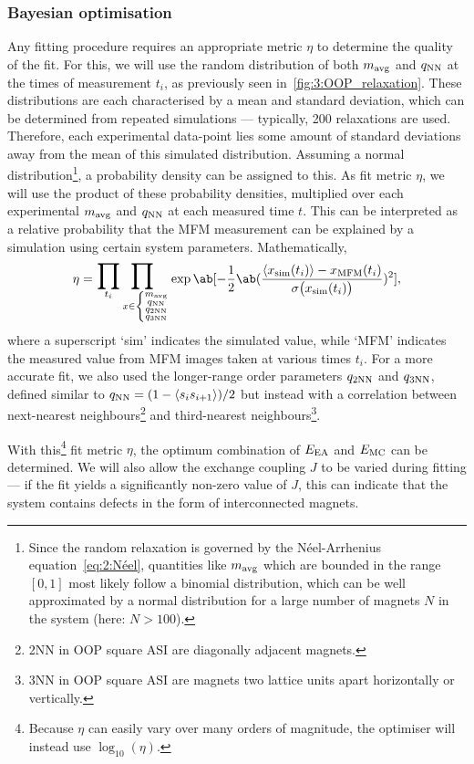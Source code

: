 \subsubsection{Bayesian optimisation}
Any fitting procedure requires an appropriate metric $\eta$ to determine the quality of the fit.
For this, we will use the random distribution of both $\mavg$ and $\qNN$ at the times of measurement $t_i$, as previously seen in~\cref{fig:3:OOP_relaxation}.
These distributions are each characterised by a mean and standard deviation, which can be determined from repeated simulations --- typically, 200 relaxations are used. %
Therefore, each experimental data-point lies some amount of standard deviations away from the mean of this simulated distribution.
Assuming a normal distribution\footnote{
	Since the random relaxation is governed by the N\'eel-Arrhenius equation~\eqref{eq:2:Néel}, quantities like $\mavg$ which are bounded in the range $[0,1]$ most likely follow a binomial distribution, which can be well approximated by a normal distribution for a large number of magnets $N$ in the system (here: $N > 100$).
}, a probability density can be assigned to this.
As fit metric $\eta$, we will use the product of these probability densities, multiplied over each experimental $\mavg$ and $\qNN$ at each measured time $t$.
This can be interpreted as a relative probability that the MFM measurement can be explained by a simulation using certain system parameters.
Mathematically,
\begin{equation}
	\eta = \bigprod_{t_i} \bigprod_{x \in \left\{\substack{\mavg\\\qNN\\\qNN[2]\\\qNN[3]}\right.} \exp\ab[-\frac{1}{2} \ab(\frac{\langle x_\mathrm{sim}(t_i) \rangle - x_\mathrm{MFM}(t_i)}{\sigma\big(x_\mathrm{sim}(t_i)\big)})^2] \mathrm{,}
\end{equation}
where a superscript `sim' indicates the simulated value, while `MFM' indicates the measured value from MFM images taken at various times $t_i$.
For a more accurate fit, we also used the longer-range order parameters $\qNN[2]$ and $\qNN[3]$, defined similar to $\qNN = (1 - \langle s_i s_{i+1} \rangle)/2$ but instead with a correlation between next-nearest neighbours\footnote{
	2NN in OOP square ASI are diagonally adjacent magnets.
} and third-nearest neighbours\footnote{
	3NN in OOP square ASI are magnets two lattice units apart horizontally or vertically.
}. \par
With this\footnote{
	Because $\eta$ can easily vary over many orders of magnitude, the optimiser will instead use $\log_{10}(\eta)$.
} fit metric $\eta$, the optimum combination of $\EEA$ and $\EMC$ can be determined.
We will also allow the exchange coupling $J$ to be varied during fitting --- if the fit yields a significantly non-zero value of $J$, this can indicate that the system contains defects in the form of interconnected magnets. \\\par

